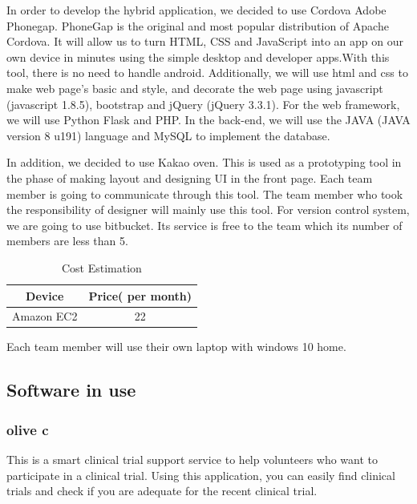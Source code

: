 \documentclass[letterpaper, 10 pt, conference]{ieeeconf}  %
\begin{document}
In order to develop the hybrid application, we decided to use Cordova Adobe Phonegap. PhoneGap is the original and most popular distribution of Apache Cordova. It will allow us to turn HTML, CSS and JavaScript into an app on our own device in minutes using the simple desktop and developer apps.With this tool, there is no need to handle android.
Additionally, we will use html and css to make web page’s basic and style, and decorate the web page using javascript (javascript 1.8.5), bootstrap and jQuery (jQuery 3.3.1). For the web framework, we will use Python Flask and PHP. In the back-end, we will use the JAVA (JAVA version 8 u191) language and MySQL to implement the database. 


In addition, we decided to use Kakao oven. This is used as a prototyping tool in the phase of making layout and designing UI in the front page. Each team member is going to communicate through this tool. The team member who took the responsibility of designer will mainly use this tool. 
For version control system, we are going to use bitbucket. Its service is free to the team which its number of members are less than 5. 


\begin{table}[h]
\caption{Cost Estimation}
\label{table_example}
\begin{center}
\begin{tabular}{|c||c|}
\hline
Device & Price( per month)\\
\hline
Amazon EC2 & 22\\
\hline
\end{tabular}
\end{center}
\end{table}


Each team member will use their own laptop with windows 10 home. 

\subsection{Software in use}
\subsubsection{olive c}
This is a smart clinical trial support service to help volunteers who want to participate in a clinical trial. Using this application, you can easily find clinical trials and check if you are adequate for the recent clinical trial.
\end{document}
